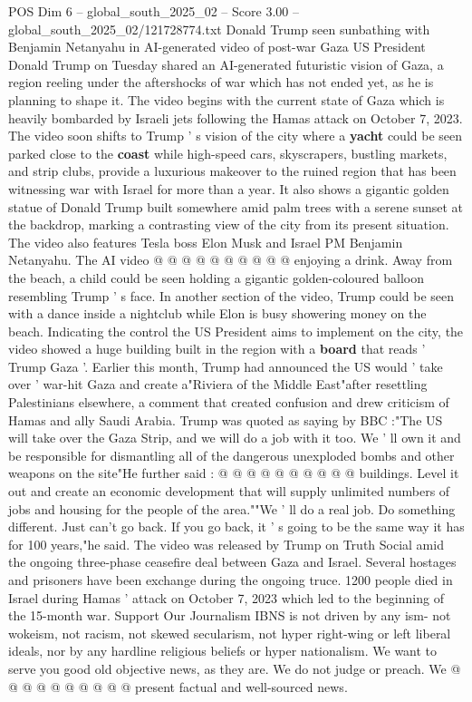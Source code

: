 \begin{textsample}{POS Dim 6 – global\_south\_2025\_02 – Score 3.00 – global\_south\_2025\_02/121728774.txt}  \label{ex:f6_pos_415}
Donald Trump seen sunbathing with Benjamin Netanyahu in AI-generated video of post-war Gaza US President Donald Trump on Tuesday shared an AI-generated futuristic vision of Gaza, a region reeling under the aftershocks of war which has not ended yet, as he is planning to shape it.
The video begins with the current state of Gaza which is heavily bombarded by Israeli jets following the Hamas attack on October 7, 2023.
The video soon shifts to Trump ' s vision of the city where a \textbf{yacht} could be seen parked close to the \textbf{coast} while high-speed cars, skyscrapers, bustling markets, and strip clubs, provide a luxurious makeover to the ruined region that has been witnessing war with Israel for more than a year.
It also shows a gigantic golden statue of Donald Trump built somewhere amid palm trees with a serene sunset at the backdrop, marking a contrasting view of the city from its present situation.
The video also features Tesla boss Elon Musk and Israel PM Benjamin Netanyahu.
The AI video @ @ @ @ @ @ @ @ @ @ enjoying a drink.
Away from the beach, a child could be seen holding a gigantic golden-coloured balloon resembling Trump ' s face.
In another section of the video, Trump could be seen with a dance inside a nightclub while Elon is busy showering money on the beach.
Indicating the control the US President aims to implement on the city, the video showed a huge building built in the region with a \textbf{board} that reads ' Trump Gaza '.
Earlier this month, Trump had announced the US would ' take over ' war-hit Gaza and create a"Riviera of the Middle East"after resettling Palestinians elsewhere, a comment that created confusion and drew criticism of Hamas and ally Saudi Arabia.
Trump was quoted as saying by BBC :"The US will take over the Gaza Strip, and we will do a job with it too.
We ' ll own it and be responsible for dismantling all of the dangerous unexploded bombs and other weapons on the site"He further said : @ @ @ @ @ @ @ @ @ @ buildings.
Level it out and create an economic development that will supply unlimited numbers of jobs and housing for the people of the area.""We ' ll do a real job.
Do something different.
Just can't go back.
If you go back, it ' s going to be the same way it has for 100 years,"he said.
The video was released by Trump on Truth Social amid the ongoing three-phase ceasefire deal between Gaza and Israel.
Several hostages and prisoners have been exchange during the ongoing truce. 1200 people died in Israel during Hamas ' attack on October 7, 2023 which led to the beginning of the 15-month war.
Support Our Journalism IBNS is not driven by any ism- not wokeism, not racism, not skewed secularism, not hyper right-wing or left liberal ideals, nor by any hardline religious beliefs or hyper nationalism.
We want to serve you good old objective news, as they are.
We do not judge or preach.
We @ @ @ @ @ @ @ @ @ @ present factual and well-sourced news.

\end{textsample}
